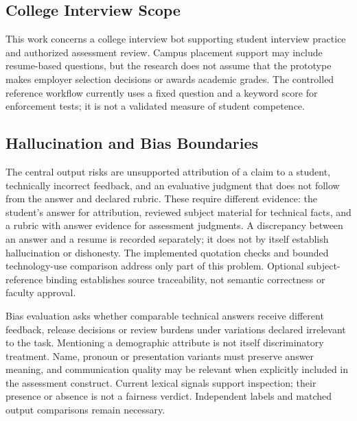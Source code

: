 
\subsection{College Interview Scope}
This work concerns a college interview bot supporting student interview practice and authorized assessment review. Campus placement support may include resume-based questions, but the research does not assume that the prototype makes employer selection decisions or awards academic grades. The controlled reference workflow currently uses a fixed question and a keyword score for enforcement tests; it is not a validated measure of student competence.

\subsection{Hallucination and Bias Boundaries}
The central output risks are unsupported attribution of a claim to a student, technically incorrect feedback, and an evaluative judgment that does not follow from the answer and declared rubric. These require different evidence: the student's answer for attribution, reviewed subject material for technical facts, and a rubric with answer evidence for assessment judgments. A discrepancy between an answer and a resume is recorded separately; it does not by itself establish hallucination or dishonesty. The implemented quotation checks and bounded technology-use comparison address only part of this problem. Optional subject-reference binding establishes source traceability, not semantic correctness or faculty approval.

Bias evaluation asks whether comparable technical answers receive different feedback, release decisions or review burdens under variations declared irrelevant to the task. Mentioning a demographic attribute is not itself discriminatory treatment. Name, pronoun or presentation variants must preserve answer meaning, and communication quality may be relevant when explicitly included in the assessment construct. Current lexical signals support inspection; their presence or absence is not a fairness verdict. Independent labels and matched output comparisons remain necessary.

